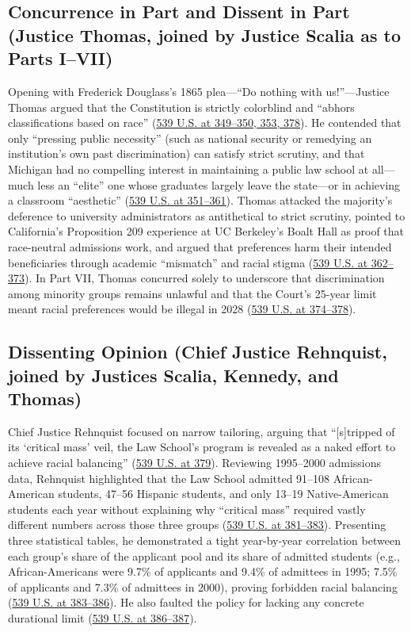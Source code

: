 \documentclass[12pt]{article}
\begin{document}
\subsection{Concurrence in Part and Dissent in Part (Justice Thomas, joined by Justice Scalia as to Parts I--VII)}
Opening with Frederick Douglass's 1865 plea---``Do nothing with us!''---Justice Thomas argued that the Constitution is strictly colorblind and ``abhors classifications based on race'' (\href{https://supreme.justia.com/cases/federal/us/539/306/}{539 U.S. at 349--350, 353, 378}). He contended that only ``pressing public necessity'' (such as national security or remedying an institution's own past discrimination) can satisfy strict scrutiny, and that Michigan had no compelling interest in maintaining a public law school at all---much less an ``elite'' one whose graduates largely leave the state---or in achieving a classroom ``aesthetic'' (\href{https://supreme.justia.com/cases/federal/us/539/306/}{539 U.S. at 351--361}). Thomas attacked the majority's deference to university administrators as antithetical to strict scrutiny, pointed to California's Proposition 209 experience at UC Berkeley's Boalt Hall as proof that race-neutral admissions work, and argued that preferences harm their intended beneficiaries through academic ``mismatch'' and racial stigma (\href{https://supreme.justia.com/cases/federal/us/539/306/}{539 U.S. at 362--373}). In Part VII, Thomas concurred solely to underscore that discrimination among minority groups remains unlawful and that the Court's 25-year limit meant racial preferences would be illegal in 2028 (\href{https://supreme.justia.com/cases/federal/us/539/306/}{539 U.S. at 374--378}).

\subsection{Dissenting Opinion (Chief Justice Rehnquist, joined by Justices Scalia, Kennedy, and Thomas)}
Chief Justice Rehnquist focused on narrow tailoring, arguing that ``[s]tripped of its `critical mass' veil, the Law School's program is revealed as a naked effort to achieve racial balancing'' (\href{https://supreme.justia.com/cases/federal/us/539/306/}{539 U.S. at 379}). Reviewing 1995--2000 admissions data, Rehnquist highlighted that the Law School admitted 91--108 African-American students, 47--56 Hispanic students, and only 13--19 Native-American students each year without explaining why ``critical mass'' required vastly different numbers across those three groups (\href{https://supreme.justia.com/cases/federal/us/539/306/}{539 U.S. at 381--383}). Presenting three statistical tables, he demonstrated a tight year-by-year correlation between each group's share of the applicant pool and its share of admitted students (e.g., African-Americans were 9.7\% of applicants and 9.4\% of admittees in 1995; 7.5\% of applicants and 7.3\% of admittees in 2000), proving forbidden racial balancing (\href{https://supreme.justia.com/cases/federal/us/539/306/}{539 U.S. at 383--386}). He also faulted the policy for lacking any concrete durational limit (\href{https://supreme.justia.com/cases/federal/us/539/306/}{539 U.S. at 386--387}).
\end{document}
